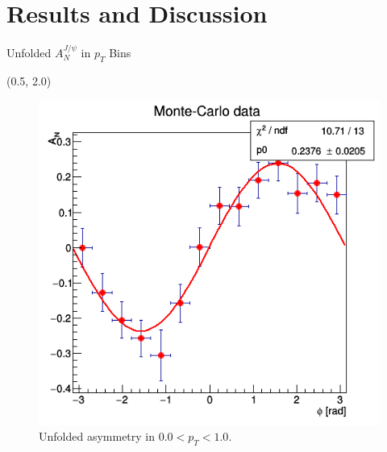 \documentclass[10pt, xcolor={dvipsnames}, aspectratio = 169]{beamer}
\begin{document}
%
%
\section{Results and Discussion}


\begin{frame}{Unfolded $A^{J/\psi}_{N}$ in $p_{T}$ Bins}

\begin{textblock}{7.0}(0.5, 2.0)
\begin{figure}
    \centering
    \includegraphics[width = 1.0\linewidth]{imgs/sigal_asym0.png}
    \caption{Unfolded asymmetry in $0.0 < p_{T} < 1.0$.}
\end{figure}
\end{textblock}


\end{frame}
\end{document}
